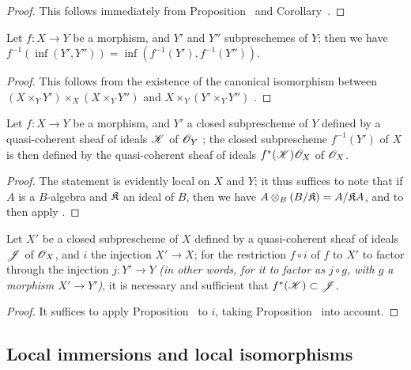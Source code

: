 \begin{proof}
\label{proof-1.4.4.3}
This follows immediately from Proposition~ and Corollary~.
\end{proof}

\begin{cor}[4.4.4]
\label{1.4.4.4}
Let $f:X\to Y$ be a morphism, and $Y'$ and $Y''$ subpreschemes of $Y$;
then we have $f^{-1}(\inf(Y',Y''))=\inf(f^{-1}(Y'),f^{-1}(Y''))$.
\end{cor}

\begin{proof}
\label{proof-1.4.4.4}
This follows from the existence of the canonical isomorphism between $(X\times_Y Y')\times_X(X\times_Y Y'')$ and $X\times_Y(Y'\times_Y Y'')$ .
\end{proof}

\begin{prop}[4.4.5]
\label{1.4.4.5}
Let $f:X\to Y$ be a morphism, and $Y'$ a closed subprescheme of $Y$ defined by a quasi-coherent sheaf of ideals $\mathscr{K}$ of $\mathscr{O}_Y$ ;
the closed subprescheme $f^{-1}(Y')$ of $X$ is then defined by the quasi-coherent sheaf of ideals $f^*(\mathscr{K})\mathscr{O}_X$ of $\mathscr{O}_X$.
\end{prop}

\begin{proof}
\label{proof-1.4.4.5}
The statement is evidently local on $X$ and $Y$;
it thus suffices to note that if $A$ is a $B$-algebra and $\mathfrak{K}$ an ideal of $B$, then we have $A\otimes_B(B/\mathfrak{K})=A/\mathfrak{K}A$, and to then apply .
\end{proof}

\begin{cor}[4.4.6]
\label{1.4.4.6}
Let $X'$ be a closed subprescheme of $X$ defined by a quasi-coherent sheaf of ideals $\mathscr{J}$ of $\mathscr{O}_X$, and $i$ the injection $X'\to X$;
for the restriction $f\circ i$ of $f$ to $X'$ to factor through the injection $j:Y'\to Y$ \emph{(in other words, for it to factor as $j\circ g$, with $g$ a morphism $X'\to Y'$)}, it is necessary and sufficient that $f^*(\mathscr{K})\subset\mathscr{J}$.
\end{cor}

\begin{proof}
\label{proof-1.4.4.6}
It suffices to apply Proposition~ to $i$, taking Proposition~ into account.
\end{proof}

\subsection{Local immersions and local isomorphisms}
\label{subsection-local-immersions-isomorphisms}

